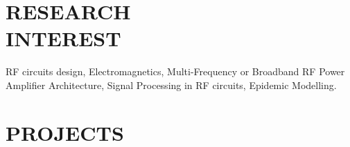 \documentclass[margin, 10pt]{res} %
\begin{document}
\begin{resume}
\section{RESEARCH \\ INTEREST}
RF circuits design, Electromagnetics, Multi-Frequency or Broadband RF Power Amplifier Architecture, Signal Processing in RF circuits, Epidemic Modelling.

\iffalse
 
\section{RESEARCH \\ EXPERIENCE}


{\sl Research Assistant} \hfill February 2018 - Present \\
Dr. Aresh Haresh Dadlani's research group, Nazarbayev University
\begin{itemize}
\item Working on Epidemic modelling research
\item Working on Wireless Sensors Networks
\item Learning how to simulate different epidemic models in MATLAB language
\item Collaborating with Kansas State University research group concerning their research about epidemic modelling
\end{itemize} 
Results: 
\begin{itemize}
\item Sufficient MATLAB programming experience
\item Useful experience in group working with other researchers
\item Draft of the paper about smart grid revenue maximization for submission to IEEE conferences
\end{itemize} 
 \fi
 
 \iffalse
 
\section{PROJECTS}
  

\end{resume}
\end{document}
